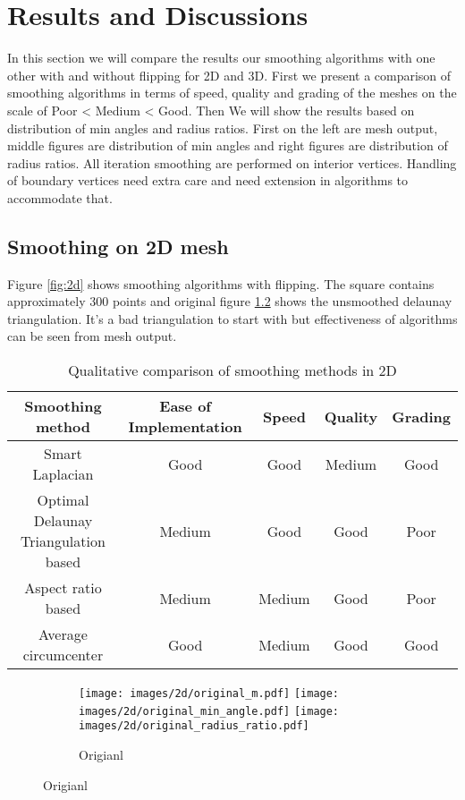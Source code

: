 \chapter{Results and Discussions}
In this section we will compare the results our smoothing algorithms with one other with and without flipping for 2D and 3D. First we present a comparison of smoothing algorithms in terms of speed, quality and grading of the meshes on the scale of Poor < Medium < Good. Then We will show the results based on distribution of min angles and radius ratios. First on the left are mesh output, middle figures are distribution of min angles and right figures are distribution of radius ratios. All iteration smoothing are performed on interior vertices. Handling of boundary vertices need extra care and need extension in algorithms \cite{Erten_2009} to accommodate that.

\section{Smoothing on 2D mesh}
Figure \ref{fig:2d} shows smoothing algorithms with flipping. The square contains approximately 300 points and original figure \ref{fig:original_2d} shows the unsmoothed delaunay triangulation. It's a bad triangulation to start with but effectiveness of algorithms can be seen from mesh output. 

\begin{table}[ht]
\caption{Qualitative comparison of smoothing methods in 2D}
\begin{center}
\begin{tabular}{ |c|c|c|c|c| } 
\hline
Smoothing method & Ease of Implementation & Speed & Quality & Grading \\ 
\hline
Smart Laplacian & Good & Good & Medium & Good \\ 
\hline
Optimal Delaunay Triangulation based & Medium & Good & Good & Poor \\ 
\hline
Aspect ratio based & Medium & Medium & Good & Poor  \\ 
\hline
Average circumcenter & Good & Medium & Good & Good  \\
\hline
\end{tabular}
\end{center}
\end{table}

\begin{figure}[H]
    \centering
    \begin{subfigure}[b]{1.0\textwidth}
        \texttt{[image: images/2d/original\_m.pdf]}
        \texttt{[image: images/2d/original\_min\_angle.pdf]}
        \texttt{[image: images/2d/original\_radius\_ratio.pdf]}
        \caption{Origianl}       
        \label{fig:original_2d}  
    \end{subfigure}
\end{figure}


